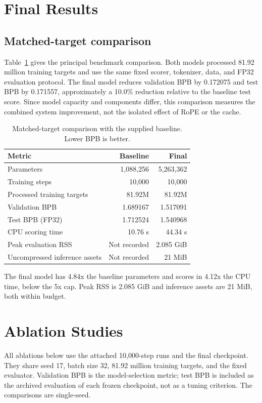 \documentclass[11pt]{article}
\begin{document}
\section{Final Results}
\subsection{Matched-target comparison}
Table~\ref{tab:main} gives the principal benchmark comparison. Both models processed 81.92 million training targets and use the same fixed scorer, tokenizer, data, and FP32 evaluation protocol. The final model reduces validation BPB by 0.172075 and test BPB by 0.171557, approximately a 10.0\% reduction relative to the baseline test score. Since model capacity and components differ, this comparison measures the combined system improvement, not the isolated effect of RoPE or the cache.

\begin{table}[ht]
\centering
\small
\caption{Matched-target comparison with the supplied baseline. Lower BPB is better.}
\label{tab:main}
\begin{tabularx}{\linewidth}{@{}Xrr@{}}
\toprule
Metric & Baseline & Final \\
\midrule
Parameters & 1,088,256 & 5,263,362 \\
Training steps & 10,000 & 10,000 \\
Processed training targets & 81.92M & 81.92M \\
Validation BPB & 1.689167 & 1.517091 \\
Test BPB (FP32) & 1.712524 & 1.540968 \\
CPU scoring time & 10.76 s & 44.34 s \\
Peak evaluation RSS & Not recorded & 2.085 GiB \\
Uncompressed inference assets & Not recorded & 21 MiB \\
\bottomrule
\end{tabularx}
\end{table}

The final model has 4.84x the baseline parameters and scores in 4.12x the CPU time, below the 5x cap. Peak RSS is 2.085 GiB and inference assets are 21 MiB, both within budget.

\section{Ablation Studies}
All ablations below use the attached 10,000-step runs and the final checkpoint. They share seed 17, batch size 32, 81.92 million training targets, and the fixed evaluator. Validation BPB is the model-selection metric; test BPB is included as the archived evaluation of each frozen checkpoint, not as a tuning criterion. The comparisons are single-seed.
\end{document}
